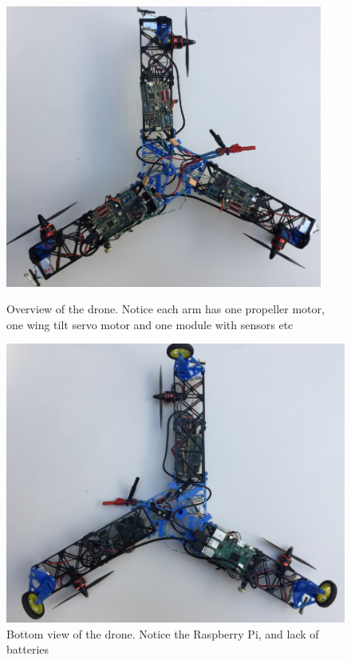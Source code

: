 \begin{figure}[h!]
    \centering
    \begin{minipage}[t]{.48\textwidth}
        \centering
        \includegraphics[width=0.93\textwidth]{figures/analysis/overview.png}
        \caption{Overview of the drone. Notice each arm has one propeller motor, one wing tilt servo motor and one module with sensors etc}
        \label{fig:topviewdrone}
    \end{minipage}%
    \hspace{.03\textwidth}
    \begin{minipage}[t]{0.48\textwidth}
        \centering
        \includegraphics[width=1\textwidth]{figures/analysis/bottomview.png}
        \caption{Bottom view of the drone. Notice the Raspberry Pi, and lack of batteries}
        \label{fig:bottomviewdrone}
    \end{minipage}
\end{figure} 

